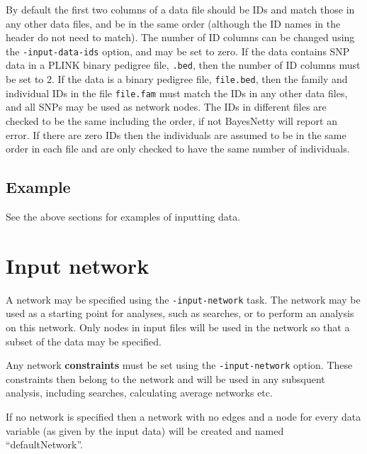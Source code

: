 \documentclass[a4paper,12pt]{article}
\newcommand{\code}[1]{{\footnotesize{{\tt #1}}}}
\begin{document}
By default the first two columns of a data file should be IDs and match those in any other data files, and be in the same order (although the ID names in the header do not need to match). The number of ID columns can be changed using the \code{-input-data-ids} option, and may be set to zero. If the data contains SNP data in a PLINK binary pedigree file, \code{.bed}, then the number of ID columns must be set to 2. If the data is a binary pedigree file, \code{file.bed}, then the family and individual IDs in the file \code{file.fam} must match the IDs in any other data files, and all SNPs may be used as network nodes. The IDs in different files are checked to be the same including the order, if not BayesNetty will report an error. If there are zero IDs then the individuals are assumed to be in the same order in each file and are only checked to have the same number of individuals. 


\subsection{Example}
\label{input-data-example}

See the above sections for examples of inputting data. 




\section{Input network}
\label{input-network}

A network may be specified using the \code{-input-network} task. The network may be used as a starting point for analyses, such as searches, or to perform an analysis on this network. Only nodes in input files will be used in the network so that a subset of the data may be specified. 

Any network {\bf constraints} must be set using the \code{-input-network} option. These constraints then belong to the network and will be used in any subsquent analysis, including searches, calculating average networks etc. 

If no network is specified then a network with no edges and a node for every data variable (as given by the input data) will be created and named ``defaultNetwork''. 
\end{document}
